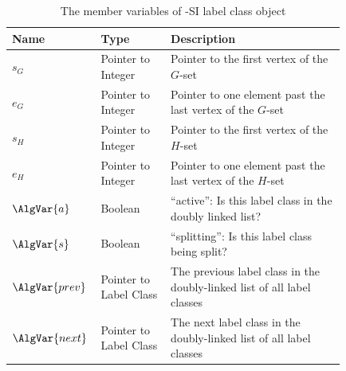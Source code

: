 \begin{table}[h!]
\centering
\footnotesize
 \begin{tabular}{p{0.13\linewidth} p{0.2\linewidth} p{0.5\linewidth}}
 \toprule
    Name & Type & Description \\ [0.5ex]
 \midrule
    $s_G$ & Pointer to Integer & Pointer to the first vertex of the $G$-set\\
    \rule{0pt}{2.3ex}$e_G$ & Pointer to Integer & Pointer to one element past the last vertex of the $G$-set\\
    \rule{0pt}{2.3ex}$s_H$ & Pointer to Integer & Pointer to the first vertex of the $H$-set\\
    \rule{0pt}{2.3ex}$e_H$ & Pointer to Integer & Pointer to one element past the last vertex of the $H$-set\\
    \rule{0pt}{2.3ex}$\AlgVar{a}$ & Boolean & ``active'': Is this label class in the doubly linked list? \\
    \rule{0pt}{2.3ex}$\AlgVar{s}$ & Boolean & ``splitting'': Is this label class being split? \\
    \rule{0pt}{2.3ex}$\AlgVar{prev}$ & Pointer to Label Class & The previous label class in the doubly-linked list of all label classes \\
    \rule{0pt}{2.3ex}$\AlgVar{next}$ & Pointer to Label Class & The next label class in the doubly-linked list of all label classes \\
 \bottomrule
\end{tabular}
\caption{The member variables of \McSplit-SI label class object}
\label{tab:mcsplit-si-object}
\end{table}

\FloatBarrier

